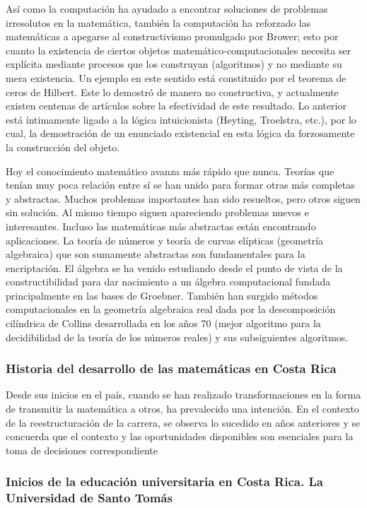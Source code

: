 Así como la computación ha ayudado a encontrar soluciones de problemas irresolutos en la matemática, también la computación ha reforzado las matemáticas a apegarse al constructivismo promulgado por Brower; esto por cuanto la existencia de ciertos objetos matemático-computacionales necesita ser explícita mediante procesos que los construyan (algoritmos) y no mediante su mera existencia. Un ejemplo en este sentido está constituido por el teorema de ceros de Hilbert. Este lo demostró de manera no constructiva, y actualmente existen centenas de artículos sobre la
efectividad de este resultado. Lo anterior está íntimamente ligado a la lógica intuicionista (Heyting, Troelstra, etc.), por lo cual, la demostración de un enunciado existencial en esta lógica da forzosamente la construcción del objeto. 

Hoy el conocimiento matemático avanza más rápido que nunca. Teorías que tenían muy poca relación entre sí se han unido para formar otras más completas y abstractas. Muchos problemas importantes han sido resueltos, pero otros siguen sin solución. Al mismo tiempo siguen apareciendo problemas nuevos e interesantes. Incluso las matemáticas más abstractas están encontrando aplicaciones. La teoría de números y teoría de curvas elípticas (geometría algebraica) que son sumamente abstractas son fundamentales para la encriptación. El álgebra se ha venido estudiando desde el punto de vista de la constructibilidad para dar nacimiento a un álgebra computacional fundada principalmente en las bases de Groebner. También han surgido métodos computacionales en la geometría algebraica real dada por la descomposición cilíndrica de Collins desarrollada en los años 70 (mejor algoritmo para la decidibilidad de la teoría de los números reales) y sus subsiguientes algoritmos.

\subsubsection{Historia del desarrollo de las matemáticas en Costa Rica}

Desde sus inicios en el país, cuando se han realizado transformaciones en la forma de transmitir la matemática a otros, ha prevalecido una intención. En el contexto de la reestructuración de la carrera, se observa lo sucedido en años anteriores y se concuerda que el contexto y las oportunidades disponibles son esenciales para la toma de decisiones correspondiente

\subsubsection*{Inicios de la educación universitaria en Costa Rica. La Universidad de Santo Tomás}


